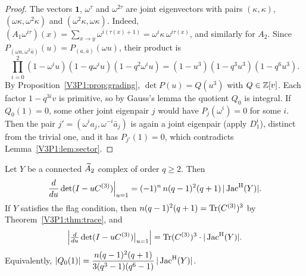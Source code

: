 \begin{proof}
The vectors $\mathbf 1$, $\omega^{\tau}$ and $\omega^{2\tau}$ are joint eigenvectors with
pairs $(\kappa,\kappa)$, $(\omega\kappa,\omega^{2}\kappa)$ and
$(\omega^{2}\kappa,\omega\kappa)$. Indeed, $(A_1\omega^{i\tau})(x)=\sum_{x\to y}
\omega^{i(\tau(x)+1)}=\omega^{i}\kappa\,\omega^{i\tau(x)}$, and similarly for $A_2$. Since
$P_{(\omega a,\omega^{2}\bar a)}(u)=P_{(a,\bar a)}(\omega u)$, their product is
\[
\prod_{i=0}^{2}(1-\omega^{i}u)(1-q\omega^{i}u)(1-q^{2}\omega^{i}u)=(1-u^{3})(1-q^{3}u^{3})(1-q^{6}u^{3}).
\]
By Proposition~\ref{V3P1:prop:grading}, $\det P(u)=Q(u^{3})$ with $Q\in\mathbb{Z}[v]$. Each factor
$1-q^{3i}v$ is primitive, so by Gauss's lemma the quotient $Q_0$ is integral. If $Q_0(1)=0$,
some other joint eigenpair $j$ would have $P_j(\omega^{i})=0$ for some $i$. Then the pair
$j'=(\omega^{i}a_j,\omega^{-i}\bar a_j)$ is again a joint eigenpair (apply $D_1^{i}$),
distinct from the trivial one, and it has $P_{j'}(1)=0$, which contradicts
Lemma~\ref{V3P1:lem:sector}.
\end{proof}

\begin{theorem}\label{V3P1:thm:deriv}
Let $Y$ be a connected $\widetilde A_2$ complex of order $q\ge2$. Then
\[
\frac{d}{du}\det(I-uC^{(3)})\Big|_{u=1}=(-1)^{n}\,n(q-1)^{2}(q+1)\,|\operatorname{Jac}^{\mathrm{H}}(Y)| .
\]
If $Y$ satisfies the flag condition, then $n(q-1)^{2}(q+1)=\operatorname{Tr}(C^{(3)})^{3}$ by
Theorem~\ref{V3P1:thm:trace}, and
\[
\Bigl|\tfrac{d}{du}\det(I-uC^{(3)})\big|_{u=1}\Bigr|=\operatorname{Tr}(C^{(3)})^{3}\cdot|\operatorname{Jac}^{\mathrm{H}}(Y)| .
\]
Equivalently, $|Q_0(1)|=\dfrac{n(q-1)^{2}(q+1)}{3(q^{3}-1)(q^{6}-1)}\,|\operatorname{Jac}^{\mathrm{H}}(Y)|$.
\end{theorem}


